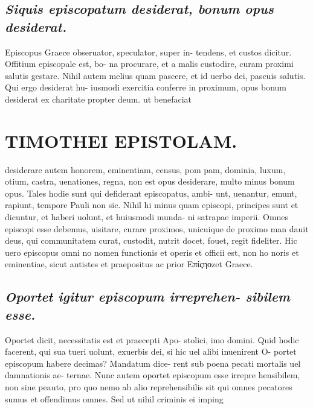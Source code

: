 \documentclass{article}
\begin{document}
\begin{pages}
\subsection*{\textit{Siquis episcopatum desiderat, bonum opus desiderat. }}\pstart Episcopus Graece obseruator, speculator, super in- tendens, et custos dicitur. Offitium episcopale est, bo- na procurare, et a malis custodire, curam proximi salutis gestare. Nihil autem melius quam pascere, et id uerbo dei, pascuis salutis. Qui ergo desiderat hu- iusmodi exercitia conferre in proximum, opus bonum desiderat ex charitate propter deum. ut benefaciat  \pend
\section*{TIMOTHEI EPISTOLAM. }
\marginpar{[ p.65 ]}\pstart desiderare autem honorem, eminentiam, census, pom pam, dominia, luxum, otium, castra, uenationes, regna, non est opus desiderare, multo minus bonum opus. Tales hodie sunt qui defiderant episcopatus, ambi- unt, uenantur, emunt, rapiunt, tempore Pauli non sic. Nihil hi minus quam episcopi, principes sunt et dicuntur, et haberi uolunt, et huiusmodi munda- ni satrapae imperii. Omnes episcopi esse debemus, uisitare, curare proximos, unicuique de proximo man dauit deus, qui communitatem curat, custodit, nutrit docet, fouet, regit fideliter. Hic uero episcopus omni no nomen functionis et operis et officii est, non ho noris et eminentiae, sicut antistes et praepositus ac prior Επίςηοzet Graece.  \pend
{}
{}
\subsection*{\textit{Oportet igitur episcopum irreprehen- sibilem esse. }}\pstart Oportet dicit, necessitatis est et praecepti Apo- stolici, imo domini. Quid hodic facerent, qui sua tueri uolunt, exuerbis dei, si hic uel alibi inuenirent O- portet episcopum habere decimas? Mandatum dice- rent sub poena pecati mortalis uel damnationis ae- ternae. Nunc autem oportet episcopum esse irrepre hensibilem, non sine peauto, pro quo nemo ab alio reprehensibilis sit qui omnes pecatores sumus et offendimus omnes. Sed ut nihil criminis ei imping  \pend

\end{pages}
\end{document}
